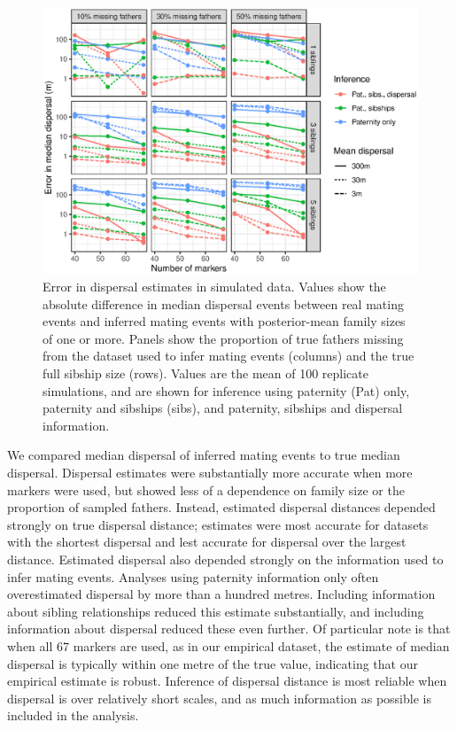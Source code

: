 \documentclass[10pt, a4paper, twocolumn]{article} %
\begin{document}
\begin{figure}
    \centering
    \includegraphics{fig-sim_dipsersal.eps}
    \caption{
        Error in dispersal estimates in simulated data.
        Values show the absolute difference in median dispersal events between real mating events and inferred mating events with posterior-mean family sizes of one or more.
        Panels show the proportion of true fathers missing from the dataset used to infer mating events (columns) and the true full sibship size (rows).
        Values are the mean of 100 replicate simulations, and are shown for inference using paternity (Pat) only, paternity and sibships (sibs), and paternity, sibships and dispersal information.
    }
    \label{fig:sim-dispersal}
\end{figure}

We compared median dispersal of inferred mating events to true median dispersal.
Dispersal estimates were substantially more accurate when more markers were used, but showed less of a dependence on family size or the proportion of sampled fathers.
Instead, estimated dispersal distances depended strongly on true dispersal distance; estimates were most accurate for datasets with the shortest dispersal and lest accurate for dispersal over the largest distance.
Estimated dispersal also depended strongly on the information used to infer mating events.
Analyses using paternity information only often overestimated dispersal by more than a hundred metres.
Including information about sibling relationships reduced this estimate substantially, and including information about dispersal reduced these even further.
Of particular note is that when all 67 markers are used, as in our empirical dataset, the estimate of median dispersal is typically within one metre of the true value, indicating that our empirical estimate is robust.
Inference of dispersal distance is most reliable when dispersal is over relatively short scales, and as much information as possible is included in the analysis.
\end{document}
